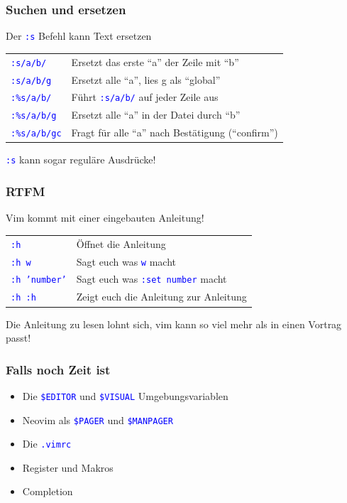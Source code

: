 \documentclass{beamer}
\newcommand{\cmd}[1]{\textcolor{blue}{\texttt{#1}}}
\begin{document}
\begin{frame}
  \frametitle{Suchen und ersetzen}
  Der \cmd{:s} Befehl kann Text ersetzen \\[0.5cm]

  \begin{tabular}{l | l}
    \cmd{:s/a/b/} & Ersetzt das erste \enquote{a} der Zeile mit \enquote{b} \\[0.2cm]
    \cmd{:s/a/b/g} & Ersetzt alle \enquote{a}, lies g als \enquote{global} \\[0.2cm]
    \cmd{:\%s/a/b/} & Führt \cmd{:s/a/b/} auf jeder Zeile aus \\[0.2cm]
    \cmd{:\%s/a/b/g} & Ersetzt alle \enquote{a} in der Datei durch \enquote{b} \\[0.2cm]
    \cmd{:\%s/a/b/gc} & Fragt für alle \enquote{a} nach Bestätigung (\enquote{confirm}) \\[0.2cm]
  \end{tabular}

  \vspace{0.5cm}

  \cmd{:s} kann sogar reguläre Ausdrücke!
\end{frame}

\begin{frame}
  \frametitle{RTFM}
  Vim kommt mit einer eingebauten Anleitung! \\[0.5cm]

  \begin{tabular}{l | l}
    \cmd{:h} & Öffnet die Anleitung \\[0.2cm]
    \cmd{:h w} & Sagt euch was \cmd{w} macht \\[0.2cm]
    \cmd{:h 'number'} & Sagt euch was \cmd{:set number} macht \\[0.2cm]
    \cmd{:h :h} & Zeigt euch die Anleitung zur Anleitung
  \end{tabular}

  \vspace{0.5cm}

  Die Anleitung zu lesen lohnt sich, vim kann so viel mehr als in einen Vortrag passt!
\end{frame}

\begin{frame}
  \frametitle{Falls noch Zeit ist}
  \begin{itemize}
    \item Die \cmd{\$EDITOR} und \cmd{\$VISUAL} Umgebungsvariablen \\[0.2cm]
    \item Neovim als \cmd{\$PAGER} und \cmd{\$MANPAGER} \\[0.2cm]
    \item Die \cmd{.vimrc} \\[0.2cm]
    \item Register und Makros \\[0.2cm]
    \item Completion
  \end{itemize}
\end{frame}
\end{document}
